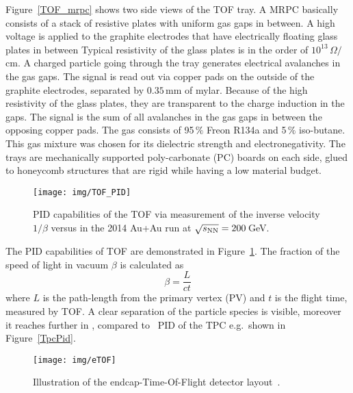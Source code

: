 Figure~\ref{TOF_mrpc} shows two side views of the TOF tray. A MRPC basically consists of a stack of resistive plates with uniform gas gaps in between. A high voltage is applied to the graphite electrodes that have electrically floating glass plates in between Typical resistivity of the glass plates is in the order of $10^{13}\,\Omega/$cm. A charged particle going through the tray generates electrical avalanches in the gas gaps. The signal is read out via copper pads on the outside of the graphite electrodes, separated by $0.35\,$mm of mylar. Because of the high resistivity of the glass plates, they are transparent to the charge induction in the gaps. The signal is the sum of all avalanches in the gas gaps in between the opposing copper pads. The gas consists of 95$\,\%$ Freon R134a and 5$\,\%$ iso-butane. This gas mixture was chosen for its dielectric strength and electronegativity. The trays are mechanically supported poly-carbonate (PC) boards on each side, glued to honeycomb structures that are rigid while having a low material budget.

\begin{figure}[!htb]
\begin{center}
 \texttt{[image: img/TOF\_PID]}\\
\end{center}
\caption[PID capabilities of the TOF via measurement of the inverse velocity versus \pt in the 2014 Au+Au run at $\snn = 200\,$GeV\@.]{\label{TOF_pid}PID capabilities of the TOF via measurement of the inverse velocity $1/\beta$ versus \pt in the 2014 Au+Au run at $\snn = 200\,$GeV\@. }
\end{figure}

The PID capabilities of TOF are demonstrated in Figure~\ref{TOF_pid}\@. The fraction of the speed of light in vacuum $\beta$ is calculated as
\begin{equation}
 \beta = \frac{L}{ct}
\end{equation}
where $L$ is the path-length from the primary vertex (PV) and $t$ is the flight time, measured by TOF\@.
A clear separation of the particle species is visible, moreover it reaches further in \pt, compared to \dedx\ PID of the TPC e.g.\ shown in Figure~\ref{TpcPid}\@.

\begin{figure}[!htb]
\begin{center}
 \texttt{[image: img/eTOF]}\\
\end{center}
\caption[Illustration of the endcap-Time-Of-Flight detector layout.]{\label{eTOF}Illustration of the endcap-Time-Of-Flight detector layout~\cite{eTOF}. }
\end{figure}

